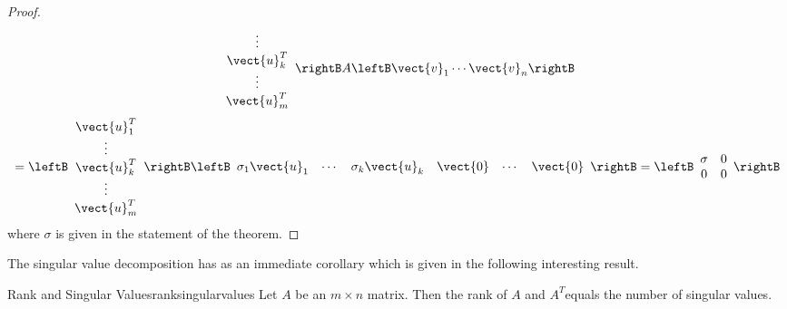 \begin{proof}
\begin{equation*}
\begin{array}{c}
\vdots \\ 
\vect{u}_{k}^T \\ 
\vdots \\ 
\vect{u}_{m}^T
\end{array}
\rightB A\leftB \vect{v}_{1}\cdots \vect{v}_{n}\rightB
\end{equation*}
\begin{equation*}
=\leftB 
\begin{array}{c}
\vect{u}_{1}^T \\ 
\vdots \\ 
\vect{u}_{k}^T \\ 
\vdots \\ 
\vect{u}_{m}^T
\end{array}
\rightB \leftB 
\begin{array}{cccccc}
\sigma _{1}\vect{u}_{1} & \cdots & \sigma _{k}\vect{u}_{k} & \vect{0}
& \cdots & \vect{0}
\end{array}
\rightB =\leftB 
\begin{array}{cc}
\sigma & 0 \\ 
0 & 0
\end{array}
\rightB
\end{equation*}
where $\sigma $ is given in the statement of the theorem. 
\end{proof}

The singular value decomposition has as an immediate corollary which is given in the following interesting result. 

\begin{corollary}{Rank and Singular Values}{ranksingularvalues}
Let $A$ be an $m\times n$ matrix. Then the rank of $A$ and $A^T$equals
the number of singular values.
\end{corollary}


